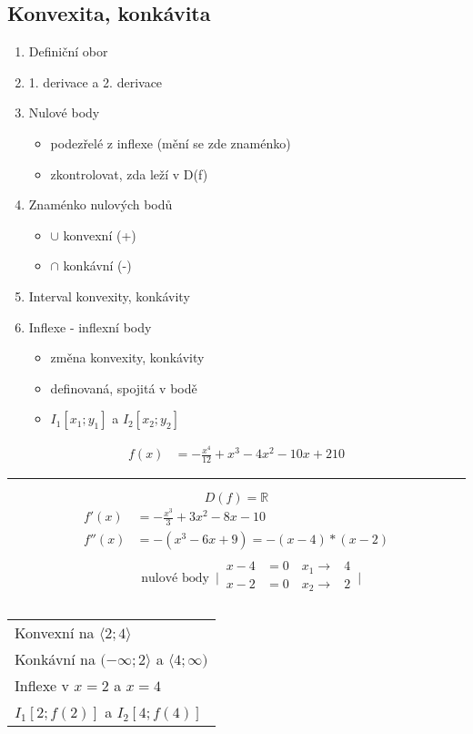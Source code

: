 \subsection{Konvexita, konkávita}
\begin{enumerate}
  \item Definiční obor
  \item 1. derivace a 2. derivace
  \item Nulové body
    \begin{itemize}
      \item podezřelé z inflexe (mění se zde znaménko)
      \item zkontrolovat, zda leží v D(f)
    \end{itemize}
  \item Znaménko nulových bodů
    \begin{itemize}
      \item $\cup$ konvexní (+)
      \item $\cap$ konkávní (-)
    \end{itemize}
  \item Interval konvexity, konkávity
  \item Inflexe - inflexní body
    \begin{itemize}
      \item změna konvexity, konkávity
      \item definovaná, spojitá v bodě
      \item $I_1[x_1;y_1]$ a $I_2[x_2;y_2]$
    \end{itemize}

\end{enumerate}
\begin{align*}
  f(x)&=-\frac{x^4}{12}+x^3-4x^2-10x+210
\end{align*}
\hrule
$$D(f)=\mathbb{R}$$
\begin{align*}
  f'(x)&=-\frac{x^3}{3}+3x^2-8x-10\\
  f''(x)&=-(x^3-6x+9)=-(x-4)*(x-2)\\
  &\begin{alignedat}{2}
    \text{nulové body  }\,
    \Biggr|\,
      \begin{alignedat}{2}
        x-4 &=0 \quad x_1 \rightarrow &4 \\
        x-2 &=0 \quad x_2 \rightarrow &2 \\
      \end{alignedat}
    \,\Biggr|
  \end{alignedat}
\end{align*}
\begin{center}
  \begin{tabular}{l}
    Konvexní na $\langle2;4\rangle$\\
    Konkávní na $(-\infty;2\rangle$ a $\langle4;\infty)$\\
    Inflexe v $x=2$ a $x=4$\\
    $I_1[2;f(2)]$ a $I_2[4;f(4)]$
  \end{tabular}
\end{center}

